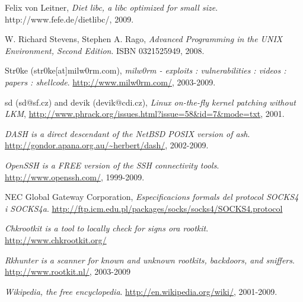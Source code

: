 \clearpage
{}
{}

\begin{thebibliography}{9}
 
  Felix von Leitner,
  \emph{Diet libc, a libc optimized for small size}.
  http://www.fefe.de/dietlibc/,
  2009.
 

  W. Richard Stevens, Stephen A. Rago,
  \emph{Advanced Programming in the UNIX Environment, Second Edition}.
  ISBN 0321525949,
  2008.


  Str0ke (str0ke[at]milw0rm.com),
  \emph{milw0rm - exploits : vulnerabilities : videos : papers : shellcode}.
  \url{http://www.milw0rm.com/},
  2003-2009.

	sd (sd@sf.cz) and devik (devik@cdi.cz),
	\emph{Linux on-the-fly kernel patching without LKM},
	\url{http://www.phrack.org/issues.html?issue=58&id=7&mode=txt},
	2001.

	\emph{DASH is a direct descendant of the NetBSD POSIX version of ash}.
	\url{http://gondor.apana.org.au/~herbert/dash/},
	2002-2009.

	\emph{OpenSSH is a FREE version of the SSH connectivity tools}.
	\url{http://www.openssh.com/},
	1999-2009.

	NEC Global Gateway Corporation,
	\emph{Especificacions formals del protocol SOCKS4 i SOCKS4a}.
	\url{http://ftp.icm.edu.pl/packages/socks/socks4/SOCKS4.protocol}

	\emph{Chkrootkit is a tool to locally check for signs ora rootkit}.
	\url{http://www.chkrootkit.org/}

	\emph{Rkhunter is a scanner for known and unknown rootkits, backdoors, and sniffers}.
	\url{http://www.rootkit.nl/},
	2003-2009

	\emph{Wikipedia, the free encyclopedia}.
	\url{http://en.wikipedia.org/wiki/},
	2001-2009.

\end{thebibliography}

